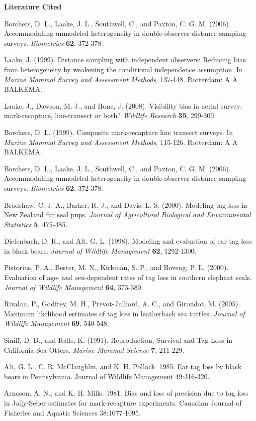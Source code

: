 \documentclass{article}
\begin{document}
\textbf{Literature Cited}

Borchers, D. L., Laake, J. L., Southwell, C., and Paxton, C. G. M. (2006). 
Accommodating unmodeled heterogeneity in double-observer distance sampling 
surveys. \textit{Biometrics} \textbf{62}, 372-378.

Laake, J. (1999). Distance sampling with independent observers: Reducing 
bias from heterogeneity by weakening the conditional independence 
assumption. In \textit{Marine Mammal Survey and Assessment Methods}, 137-148. Rotterdam: A A BALKEMA.

Laake, J., Dawson, M. J., and Hone, J. (2008). Visibility bias in aerial 
survey: mark-recapture, line-transect or both? \textit{Wildlife Research} \textbf{35}, 299-309.

Borchers, D. L. (1999). Composite mark-recapture line transect surveys. In 
\textit{Marine Mammal Survey and Assessment Methods}, 115-126. Rotterdam: A A BALKEMA.

Borchers, D. L., Laake, J. L., Southwell, C., and Paxton, C. G. M. (2006). 
Accommodating unmodeled heterogeneity in double-observer distance sampling 
surveys. \textit{Biometrics} \textbf{62}, 372-378.

Bradshaw, C. J. A., Barker, R. J., and Davis, L. S. (2000). Modeling tag 
loss in New Zealand fur seal pups. \textit{Journal of Agricultural Biological and Environmental Statistics} \textbf{5}, 475-485.

Diefenbach, D. R., and Alt, G. L. (1998). Modeling and evaluation of ear tag 
loss in black bears. \textit{Journal of Wildlife Management} \textbf{62}, 1292-1300.

Pistorius, P. A., Bester, M. N., Kirkman, S. P., and Boveng, P. L. (2000). 
Evaluation of age- and sex-dependent rates of tag loss in southern elephant 
seals. \textit{Journal of Wildlife Management} \textbf{64}, 373-380.

Rivalan, P., Godfrey, M. H., Prevot-Julliard, A. C., and Girondot, M. 
(2005). Maximum likelihood estimates of tag loss in leatherback sea turtles. 
\textit{Journal of Wildlife Management} \textbf{69}, 540-548.

Siniff, D. B., and Ralls, K. (1991). Reproduction, Survival and Tag Loss in 
California Sea Otters. \textit{Marine Mammal Science} \textbf{7}, 211-229.

Alt, G. L., C. R. McClaughlin, and K. H. Pollock. 1985. Ear tag loss by 
black bears in Pennsylvania. Journal of Wildlife Management 49:316-320.

Arnason, A. N., and K. H. Mills. 1981. Bias and loss of precision due to tag 
loss in Jolly-Seber estimates for mark-recapture experiments. Canadian 
Journal of Fisheries and Aquatic Sciences 38:1077-1095.
\end{document}
